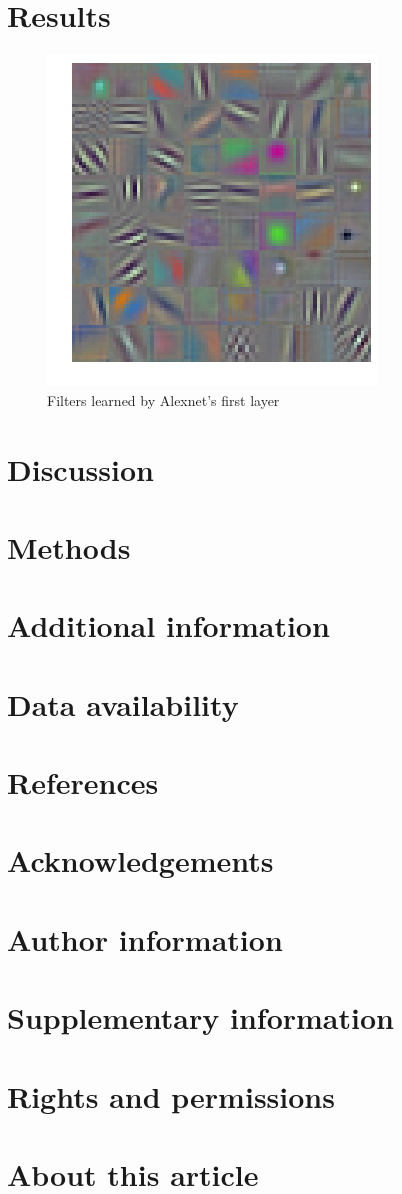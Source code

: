 \documentclass{article}
\begin{document}
\section{Results}
\begin{figure}
    \centering
    \includegraphics[width=.8\linewidth]{trainedfet}
    \caption{Filters learned by Alexnet's first layer}
    \label{fig:netspeedup}
\end{figure}
\section{Discussion}
\section{Methods}
\section{Additional information}
\section{Data availability}
\section{References}
\section{Acknowledgements}
\section{Author information}
\section{Supplementary information}
\section{Rights and permissions}
\section{About this article}
\end{document}
